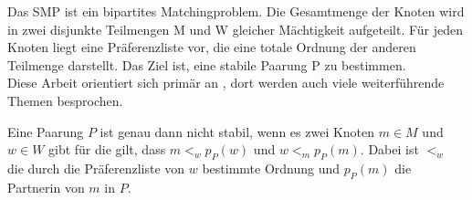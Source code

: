 Das SMP ist ein bipartites Matchingproblem. Die Gesamtmenge der Knoten wird in zwei disjunkte Teilmengen M und W gleicher Mächtigkeit aufgeteilt. Für jeden Knoten liegt eine Präferenzliste vor, die eine totale Ordnung der anderen Teilmenge darstellt. Das Ziel ist, eine stabile Paarung P zu bestimmen.\\

Diese Arbeit orientiert sich primär an \cite{Gusfield:1989}, dort werden auch viele weiterführende Themen besprochen.

\begin{Definition}
\label{stabil}
  Eine Paarung $P$ ist genau dann nicht stabil, wenn es zwei Knoten $m \in M$ und $w \in W$ gibt für die gilt, dass $m <_{w} p_{P}(w)$ und $w <_{m} p_{P}(m)$. Dabei ist $<_{w}$ die durch die Präferenzliste von $w$ bestimmte Ordnung und $p_{P}(m)$ die Partnerin von $m$ in $P$.
\end{Definition}

